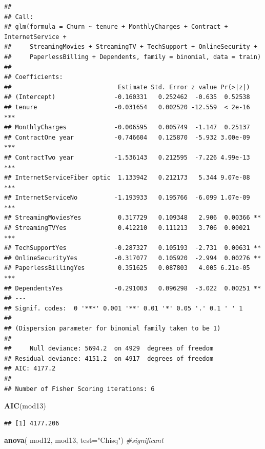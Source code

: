 \documentclass[
  twoside]{article}
\newenvironment{Shaded}{\begin{snugshade}}{\end{snugshade}}
\newcommand{\AttributeTok}[1]{\textcolor[rgb]{0.13,0.29,0.53}{#1}}
\newcommand{\CommentTok}[1]{\textcolor[rgb]{0.56,0.35,0.01}{\textit{#1}}}
\newcommand{\FunctionTok}[1]{\textcolor[rgb]{0.13,0.29,0.53}{\textbf{#1}}}
\newcommand{\NormalTok}[1]{#1}
\newcommand{\StringTok}[1]{\textcolor[rgb]{0.31,0.60,0.02}{#1}}
\begin{document}
\begin{verbatim}
## 
## Call:
## glm(formula = Churn ~ tenure + MonthlyCharges + Contract + InternetService + 
##     StreamingMovies + StreamingTV + TechSupport + OnlineSecurity + 
##     PaperlessBilling + Dependents, family = binomial, data = train)
## 
## Coefficients:
##                             Estimate Std. Error z value Pr(>|z|)    
## (Intercept)                -0.160331   0.252462  -0.635  0.52538    
## tenure                     -0.031654   0.002520 -12.559  < 2e-16 ***
## MonthlyCharges             -0.006595   0.005749  -1.147  0.25137    
## ContractOne year           -0.746604   0.125870  -5.932 3.00e-09 ***
## ContractTwo year           -1.536143   0.212595  -7.226 4.99e-13 ***
## InternetServiceFiber optic  1.133942   0.212173   5.344 9.07e-08 ***
## InternetServiceNo          -1.193933   0.195766  -6.099 1.07e-09 ***
## StreamingMoviesYes          0.317729   0.109348   2.906  0.00366 ** 
## StreamingTVYes              0.412210   0.111213   3.706  0.00021 ***
## TechSupportYes             -0.287327   0.105193  -2.731  0.00631 ** 
## OnlineSecurityYes          -0.317077   0.105920  -2.994  0.00276 ** 
## PaperlessBillingYes         0.351625   0.087803   4.005 6.21e-05 ***
## DependentsYes              -0.291003   0.096298  -3.022  0.00251 ** 
## ---
## Signif. codes:  0 '***' 0.001 '**' 0.01 '*' 0.05 '.' 0.1 ' ' 1
## 
## (Dispersion parameter for binomial family taken to be 1)
## 
##     Null deviance: 5694.2  on 4929  degrees of freedom
## Residual deviance: 4151.2  on 4917  degrees of freedom
## AIC: 4177.2
## 
## Number of Fisher Scoring iterations: 6
\end{verbatim}

\begin{Shaded}
\begin{Highlighting}[]
\FunctionTok{AIC}\NormalTok{(mod13)}
\end{Highlighting}
\end{Shaded}

\begin{verbatim}
## [1] 4177.206
\end{verbatim}

\begin{Shaded}
\begin{Highlighting}[]
\FunctionTok{anova}\NormalTok{( mod12, mod13,  }\AttributeTok{test=}\StringTok{"Chisq"}\NormalTok{) }\CommentTok{\#significant}
\end{Highlighting}
\end{Shaded}
\end{document}
